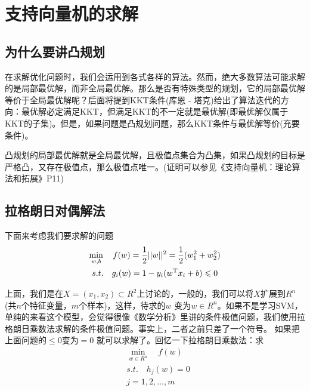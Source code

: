 \section{支持向量机的求解}

	\subsection{为什么要讲凸规划}
		\par
		在求解优化问题时，我们会运用到各式各样的算法。然而，绝大多数算法可能求解的是局部最优解，而非全局最优解。那么是否有特殊类型的规划，它的局部最优解等价于全局最优解呢？后面将提到KKT条件(库恩 - 塔克)给出了算法迭代的方向：最优解必定满足KKT，但满足KKT的不一定就是最优解(即最优解仅属于KKT的子集)。但是，如果问题是凸规划问题，那么KKT条件与最优解等价(充要条件)。
		\par
		凸规划的局部最优解就是全局最优解，且极值点集合为凸集，如果凸规划的目标是严格凸，又存在极值点，那么极值点唯一。(证明可以参见《支持向量机：理论算法和拓展》P11)

	\subsection{拉格朗日对偶解法}
		\par
		下面来考虑我们要求解的问题
		\begin{gather}
		\min_{w,b}\quad f(w)=\frac{1}{2}||w||^2= \frac{1}{2}(w_1^2+w_2^2)\\
		s.t.\quad g_i(w)=1-y_i(w^ \mathrm{ T } x_i+b ) \leqslant 0\notag
		\end{gather}
		\par
		上面，我们是在$X=(x_1,x_2)\subset R^2$上讨论的，一般的，我们可以将$X$扩展到$R^n$(共$n$个特征变量，$m$个样本)，这样，待求的$w$ 变为$w\in R^n$。如果不是学习SVM，单纯的来看这个模型，会觉得很像《数学分析》里讲的条件极值问题，我们使用拉格朗日乘数法求解的条件极值问题。事实上，二者之前只差了一个符号。 如果把上面问题的$ \leqslant 0$变为$=0$ 就可以求解了。回忆一下拉格朗日乘数法：求
		\begin{align*}
		&\min_{w\in R^n}\quad f(w)\\
		&s.t.\quad h_j(w)= 0\\
		&j=1,2,\dots ,m
		\end{align*}

